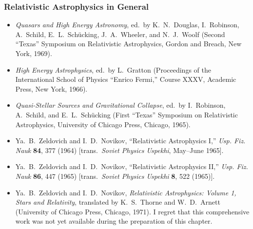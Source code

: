 

\subsubsection*{Relativistic Astrophysics in General}

\begin{itemize}
  \item[\(\square\)] \emph{Quasars and High Energy Astronomy}, ed.\ by
  K.~N.~Douglas, I.~Robinson, A.~Schild, E.~L.~Sch\"ucking,
  J.~A.~Wheeler, and N.~J.~Woolf (Second ``Texas'' Symposium on
  Relativistic Astrophysics, Gordon and Breach, New York, 1969).

  \item[\(\square\)] \emph{High Energy Astrophysics}, ed.\ by L.~Gratton
  (Proceedings of the International School of Physics ``Enrico Fermi,''
  Course XXXV, Academic Press, New York, 1966).

  \item[\(\square\)] \emph{Quasi-Stellar Sources and Gravitational
  Collapse}, ed.\ by I.~Robinson, A.~Schild, and E.~L.~Sch\"ucking
  (First ``Texas'' Symposium on Relativistic Astrophysics, University of
  Chicago Press, Chicago, 1965).

  \item[\(\square\)] Ya.~B.~Zeldovich and I.~D.~Novikov,
  ``Relativistic Astrophysics I,'' \emph{Usp. Fiz. Nauk} \textbf{84}, 377
  (1964) [trans.\ \emph{Soviet Physics Uspekhi}, May--June 1965].

  \item[\(\square\)] Ya.~B.~Zeldovich and I.~D.~Novikov,
  ``Relativistic Astrophysics II,'' \emph{Usp. Fiz. Nauk} \textbf{86}, 447
  (1965) [trans.\ \emph{Soviet Physics Uspekhi} \textbf{8}, 522 (1965)].

  \item[\(\square\)] Ya.~B.~Zeldovich and I.~D.~Novikov,
  \emph{Relativistic Astrophysics: Volume 1, Stars and Relativity},
  translated by K.~S.~Thorne and W.~D.~Arnett (University of Chicago
  Press, Chicago, 1971). I regret that this comprehensive work was not yet
  available during the preparation of this chapter.
\end{itemize}


